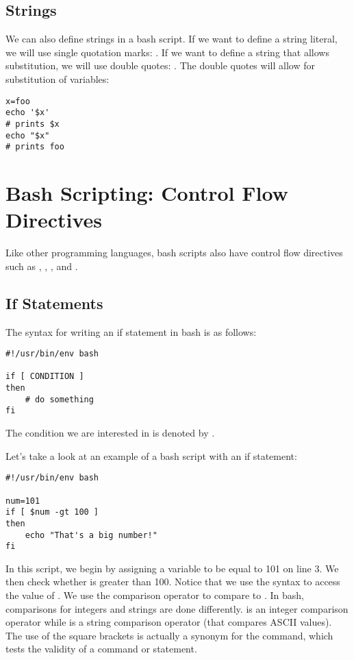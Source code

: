 \documentclass{article}
\begin{document}
\subsection{Strings}
We can also define strings in a bash script. If we want to define a string literal, we will use single quotation marks: . If we want to define a string that allows substitution, we will use double quotes: . The double quotes will allow for substitution of variables:
\begin{lstlisting}[style=Python]
x=foo
echo '$x'
# prints $x
echo "$x"
# prints foo
\end{lstlisting}
\section{Bash Scripting: Control Flow Directives}
Like other programming languages, bash scripts also have control flow directives such as , , , and . 
\subsection{If Statements}
The syntax for writing an if statement in bash is as follows: 
\begin{lstlisting}[style=Python]
#!/usr/bin/env bash

if [ CONDITION ]
then
	# do something
fi

\end{lstlisting}
The condition we are interested in is denoted by .
\par 
Let's take a look at an example of a bash script with an if statement:
\begin{lstlisting}[style=Python]
#!/usr/bin/env bash

num=101
if [ $num -gt 100 ]
then
	echo "That's a big number!"
fi

\end{lstlisting}
In this script, we begin by assigning a variable  to be equal to 101 on line 3. We then check whether  is greater than 100. Notice that we use the syntax  to access the value of . We use the comparison operator  to compare  to . In bash, comparisons for integers and strings are done differently.  is an integer comparison operator while \inlinecode{>} is a string comparison operator (that compares ASCII values). The use of the square brackets is actually a synonym for the  command, which tests the validity of a command or statement.
\par
\end{document}
